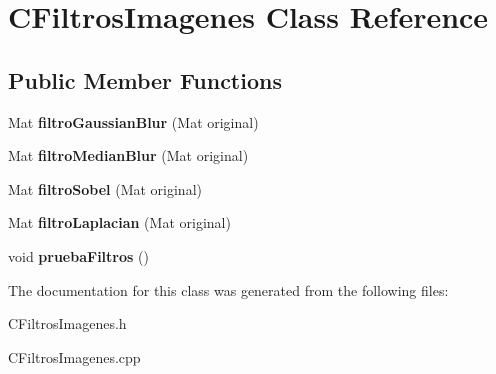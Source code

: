 \hypertarget{classCFiltrosImagenes}{}\section{C\+Filtros\+Imagenes Class Reference}
\label{classCFiltrosImagenes}
\subsection*{Public Member Functions}
\begin{DoxyCompactItemize}
\item 
Mat {\bfseries filtro\+Gaussian\+Blur} (Mat original)\hypertarget{classCFiltrosImagenes_a4fb22fba45bab47d81904429e8f250f0}{}\label{classCFiltrosImagenes_a4fb22fba45bab47d81904429e8f250f0}

\item 
Mat {\bfseries filtro\+Median\+Blur} (Mat original)\hypertarget{classCFiltrosImagenes_a98ef01d019a234d186e1ac47d76c09de}{}\label{classCFiltrosImagenes_a98ef01d019a234d186e1ac47d76c09de}

\item 
Mat {\bfseries filtro\+Sobel} (Mat original)\hypertarget{classCFiltrosImagenes_a6ba12449903681d11aba15c065e48e61}{}\label{classCFiltrosImagenes_a6ba12449903681d11aba15c065e48e61}

\item 
Mat {\bfseries filtro\+Laplacian} (Mat original)\hypertarget{classCFiltrosImagenes_ad9cd3070a534acc987a3bf15555590c2}{}\label{classCFiltrosImagenes_ad9cd3070a534acc987a3bf15555590c2}

\item 
void {\bfseries prueba\+Filtros} ()\hypertarget{classCFiltrosImagenes_ac5bf9185d05955f93480cba9f158641d}{}\label{classCFiltrosImagenes_ac5bf9185d05955f93480cba9f158641d}

\end{DoxyCompactItemize}


The documentation for this class was generated from the following files\+:\begin{DoxyCompactItemize}
\item 
C\+Filtros\+Imagenes.\+h\item 
C\+Filtros\+Imagenes.\+cpp\end{DoxyCompactItemize}
